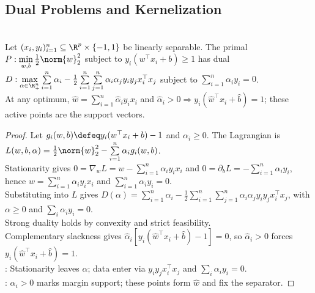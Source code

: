 \subsection{Dual Problems and Kernelization}
\begin{proposition} \label{prop:sl-hard-margin-dual-support-vectors} \\
Let $(x_i,y_i)_{i=1}^n\subseteq\R^p\times\{-1,1\}$ be linearly separable. The primal $P:\min\limits_{w,b}\frac12\norm{w}_2^2$ subject to $y_i(w^\top x_i+b)\geq1$ has dual $D:\max\limits_{\alpha\in\R_+^n}\sum\limits_{i=1}^{n}\alpha_i-\frac12\sum\limits_{i=1}^{n}\sum\limits_{j=1}^{n}\alpha_i\alpha_jy_iy_j x_i^\top x_j$ subject to $\sum\limits_{i=1}^n\alpha_i y_i=0$.\\
At any optimum, $\widehat{w}=\sum\limits_{i=1}^n\widehat{\alpha}_iy_ix_i$ and $\widehat{\alpha}_i>0\Rightarrow y_i(\widehat{w}^\top x_i+\widehat{b})=1$; these active points are the support vectors.
\end{proposition}
\begin{proof} Let $g_i(w,b)\defeq y_i(w^\top x_i+b)-1$ and $\alpha_i\geq0$. The Lagrangian is $L(w,b,\alpha)=\frac12\norm{w}_2^2-\sum\limits_{i=1}^n\alpha_i g_i(w,b)$.\\
Stationarity gives $0=\nabla_wL=w-\sum\limits_{i=1}^n\alpha_i y_i x_i$ and $0=\partial_bL=-\sum\limits_{i=1}^n\alpha_i y_i$, hence $w=\sum\limits_{i=1}^n\alpha_i y_i x_i$ and $\sum\limits_{i=1}^n\alpha_i y_i=0$.\\
Substituting into $L$ gives $D(\alpha)=\sum\limits_{i=1}^n\alpha_i-\frac12\sum\limits_{i=1}^n\sum\limits_{j=1}^n\alpha_i\alpha_jy_iy_jx_i^\top x_j$, with $\alpha\geq0$ and $\sum\limits_i\alpha_i y_i=0$.\\
Strong duality holds by convexity and strict feasibility.\\
Complementary slackness gives $\widehat{\alpha}_i[y_i(\widehat{w}^\top x_i+\widehat{b})-1]=0$, so $\widehat{\alpha}_i>0$ forces $y_i(\widehat{w}^\top x_i+\widehat{b})=1$.\\
: Stationarity leaves $\alpha$; data enter via $y_iy_jx_i^\top x_j$ and $\sum\limits_i\alpha_i y_i=0$.\\
: $\alpha_i>0$ marks margin support; these points form $\widehat{w}$ and fix the separator.
\end{proof}

